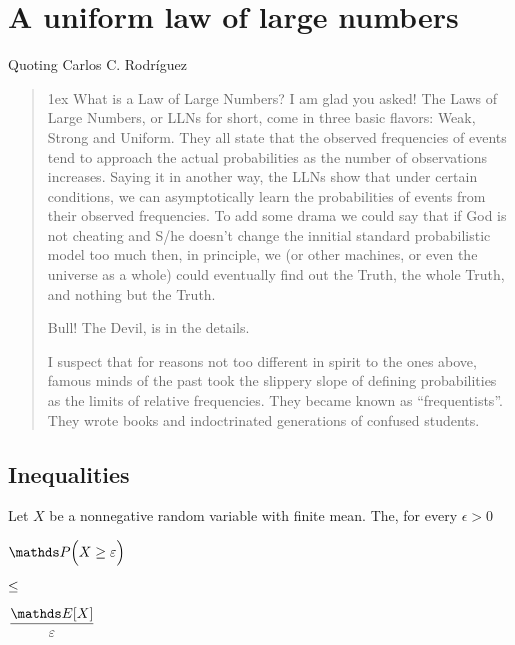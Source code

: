 \documentclass[scombinatorics.tex]{subfiles}
\begin{document}
\chapter{A uniform law of large numbers}
\label{ulln}



\def\medrel#1{\parbox[t]{5ex}{$\displaystyle\hfil #1$}}
\def\ceq#1#2#3{\parbox[t]{25ex}{$\displaystyle #1$}\medrel{#2}{$\displaystyle #3$}}

Quoting Carlos C. Rodr\'iguez

\begin{quotation}\parindent0mm\parskip1ex\noindent
What is a Law of Large Numbers?
I am glad you asked! The Laws of Large Numbers, or LLNs for short, come in
three basic flavors: Weak, Strong and Uniform. They all state that the observed
frequencies of events tend to approach the actual probabilities as the number
of observations increases. Saying it in another way, the LLNs show that under
certain conditions, we can asymptotically learn the probabilities of events from
their observed frequencies. To add some drama we could say that if God is
not cheating and S/he doesn’t change the innitial standard probabilistic model
too much then, in principle, we (or other machines, or even the universe as a
whole) could eventually find out the Truth, the whole Truth, and nothing but
the Truth.

Bull! The Devil, is in the details.

I suspect that for reasons not too different in spirit to the ones above, famous
minds of the past took the slippery slope of defining probabilities as the limits
of relative frequencies. They became known as “frequentists”. They wrote
books and indoctrinated generations of confused students.
\end{quotation}

\section{Inequalities}


\begin{void_thm}\label{Markov}
  Let $X$ be a nonnegative random variable with finite mean.
  The, for every $\epsilon>0$

  \ceq{\hfill\Pr\Big(X\ge\epsilon\Big)}{\le}{\frac{\Ex[X]}{\epsilon}}
\end{void_thm}
\end{document}
